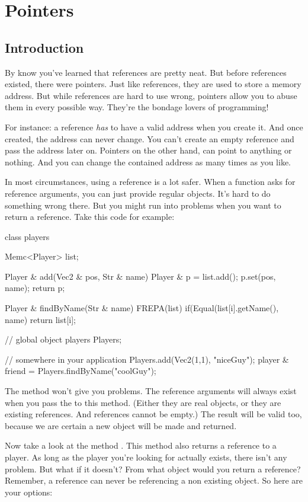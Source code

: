 \chapter{Pointers}

\section{Introduction}
By know you've learned that references are pretty neat. But before references existed, there were pointers. Just like references, they are used to store a memory address. But while references are hard to use wrong, pointers allow you to abuse them in every possible way. They're the bondage lovers of programming!

For instance: a reference \textsl{has} to have a valid address when you create it. And once created, the address can never change. You can't create an empty reference and pass the address later on. Pointers on the other hand, can point to anything or nothing. And you can change the contained address as many times as you like.

In most circumstances, using a reference is a lot safer. When a function asks for reference arguments, you can just provide regular objects. It's hard to do something wrong there. But you might run into problems when you want to return a reference. Take this code for example:

\begin{code}
class players {
  Memc<Player> list;
	
  Player &  add(Vec2 & pos, Str & name) {
    Player & p = list.add();
    p.set(pos, name);
    return p;
  }	  

  Player & findByName(Str & name) {
    FREPA(list) {
      if(Equal(list[i].getName(), name) {
        return list[i];
      }
    }
  }	
}
// global object
players Players;

// somewhere in your application
Players.add(Vec2(1,1), "niceGuy");
player & friend = Players.findByName("coolGuy");
\end{code}

The  method won't give you problems. The reference arguments will always exist when you pass the to this method. (Either they are real objects, or they are existing references. And references cannot be empty.) The result will be valid too, because we are certain a new object will be made and returned.

Now take a look at the method . This method also returns a reference to a player. As long as the player you're looking for actually exists, there isn't any problem. But what if it doesn't? From what object would you return a reference? Remember, a reference can never be referencing a non existing object. So here are your options:

